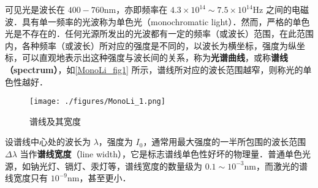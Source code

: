

可见光是波长在 $400-760\mathrm{nm}$，亦即频率在 $4.3 \times 10^{14} \sim 7.5 \times 10^{14} \mathrm{Hz}$ 之间的电磁波．具有单一频率的光波称为单色光（monochromatic light）．然而，严格的单色光是不存在的．任何光源所发出的光波都有一定的频率（或波长）范围，在此范围内，各种频率（或波长）所对应的强度是不同的，以波长为横坐标，强度为纵坐标，可以直观地表示出这种强度与波长间的关系，称为\textbf{光谱曲线}，或称\textbf{谱线（spectrum）}，如\autoref{MonoLi_fig1} 所示，谱线所对应的波长范围越窄，则称光的单色性越好．
\begin{figure}[ht]
\centering
\texttt{[image: ./figures/MonoLi\_1.png]}
\caption{谱线及其宽度} \label{MonoLi_fig1}
\end{figure}

设谱线中心处的波长为 $\lambda$，强度为 $I_0$，通常用最大强度的一半所包围的波长范围 $\Delta\lambda$ 当作\textbf{谱线宽度}（line width），它是标志谱线单色性好坏的物理量．普通单色光源，如钠光灯、镉灯、汞灯等，谱线宽度的数量级为 $0.1 \sim 10^{-3} \mathrm{nm}$，而激光的谱线宽度只有 $10^{-9}\mathrm{nm}$，甚至更小．
